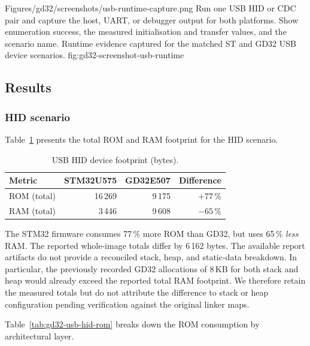   \reportscreenshot
    {Figures/gd32/screenshots/usb-runtime-capture.png}
    {Run one USB HID or CDC pair and capture the host, UART, or debugger output for both platforms. Show enumeration success, the measured initialisation and transfer values, and the scenario name.}
    {Runtime evidence captured for the matched ST and GD32 USB device scenarios.}
    {fig:gd32-screenshot-usb-runtime}

\subsection{Results}
\label{sec:gd32-usb-results}

\subsubsection{HID scenario}
\label{sec:gd32-usb-hid}

Table~\ref{tab:gd32-usb-hid-footprint} presents the total ROM and RAM footprint for the
HID scenario.

\begin{table}[H]
  \centering
  \caption{USB HID device footprint (bytes).}
  \label{tab:gd32-usb-hid-footprint}
  \begin{tabular}{l r r r}
    \toprule
    \textbf{Metric} & \textbf{STM32U575} & \textbf{GD32E507} & \textbf{Difference} \\
    \midrule
    ROM (total) & 16\,269 & 9\,175  & $+77\,\%$ \\
    RAM (total) & 3\,446  & 9\,608  & $-65\,\%$ \\
    \bottomrule
  \end{tabular}
\end{table}

The STM32 firmware consumes 77\,\% more ROM than GD32, but uses 65\,\% \emph{less} RAM.
The reported whole-image totals differ by 6\,162 bytes. The available report artifacts do
not provide a reconciled stack, heap, and static-data breakdown. In particular, the
previously recorded GD32 allocations of 8\,KB for both stack and heap would already exceed
the reported total RAM footprint. We therefore retain the measured totals but do not
attribute the difference to stack or heap configuration pending verification against the
original linker maps.

Table~\ref{tab:gd32-usb-hid-rom} breaks down the ROM consumption by architectural layer.

